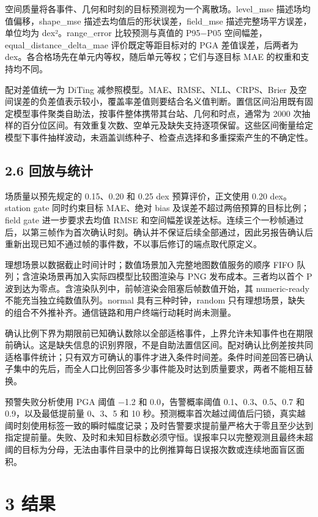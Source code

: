 \documentclass[UTF8,a4paper,11pt]{ctexart}
\begin{document}
空间质量将各事件、几何和时刻的目标预测视为一个离散场。level\_mse 描述场均值偏移，shape\_mse 描述去均值后的形状误差，field\_mse 描述完整场平方误差，单位均为 dex²。range\_error 比较预测与真值的 P95−P05 空间幅差，equal\_distance\_delta\_mae 评价既定等距目标对的 PGA 差值误差，后两者为 dex。各合格场先在单元内等权，随后单元等权；它们与逐目标 MAE 的权重和支持均不同。

配对差值统一为 DiTing 减参照模型。MAE、RMSE、NLL、CRPS、Brier 及空间误差的负差值表示较小，覆盖率差值则要结合名义值判断。置信区间沿用既有固定模型事件聚类自助法，按事件整体携带其台站、几何和时点，通常为 2000 次抽样的百分位区间。有效重复次数、空单元及缺失支持逐项保留。这些区间衡量给定模型下事件抽样波动，未涵盖训练种子、检查点选择和多重探索产生的不确定性。

\subsection*{2.6 回放与统计}

场质量以预先规定的 0.15、0.20 和 0.25 dex 预算评价，正文使用 0.20 dex。station gate 同时约束目标 MAE、绝对 bias 及误差不超过两倍预算的目标比例；field gate 进一步要求去均值 RMSE 和空间幅差误差达标。连续三个一秒帧通过后，以第三帧作为首次确认时刻。确认并不保证后续全部通过，因此另报告确认后重新出现已知不通过帧的事件数，不以事后修订的端点取代原定义。

理想场景以数据截止时间计时；数值场景加入完整地图数值服务的顺序 FIFO 队列；含渲染场景再加入实际四模型比较图渲染与 PNG 发布成本。三者均以首个 P 波到达为零点。含渲染队列中，前帧渲染会阻塞后帧数值开始，其 numeric-ready 不能充当独立纯数值队列。normal 具有三种时钟，random 只有理想场景，缺失的组合不外推补齐。通信链路和用户终端行动耗时尚未测量。

确认比例下界为期限前已知确认数除以全部适格事件，上界允许未知事件也在期限前确认。这是缺失信息的识别界限，不是自助法置信区间。配对确认比例差按共同适格事件统计；只有双方可确认的事件才进入条件时间差。条件时间差回答已确认子集中的先后，而全人口比例回答多少事件能及时达到质量要求，两者不能相互替换。

预警失败分析使用 PGA 阈值 −1.2 和 0.0，告警概率阈值 0.1、0.3、0.5、0.7 和 0.9，以及最低提前量 0、3、5 和 10 秒。预测概率首次越过阈值后闩锁，真实越阈时刻使用标签一致的瞬时幅度记录；及时告警要求提前量严格大于零且至少达到指定提前量。失败、及时和未知目标数必须守恒。误报率只以完整观测且最终未超阈的目标为分母，无法由事件目录中的比例推算每日误报次数或连续地面盲区面积。

\section*{3 结果}
\end{document}
